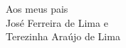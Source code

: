

\vspace{20cm}



\begin{flushright}
Aos meus pais \\ 
José Ferreira de Lima e \\
Terezinha Araújo de Lima \dagger \\ 
 
\end{flushright} 




\clearpage
\pagebreak


